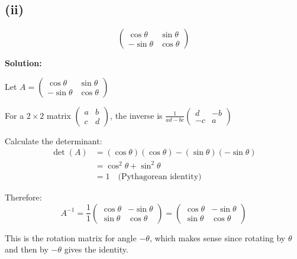 \subsection*{(ii)}
\[
\begin{pmatrix}
\cos\theta & \sin\theta\\
-\sin\theta & \cos\theta
\end{pmatrix}
\]

\textbf{Solution:}

Let $A = \begin{pmatrix}
\cos\theta & \sin\theta\\
-\sin\theta & \cos\theta
\end{pmatrix}$

For a $2 \times 2$ matrix $\begin{pmatrix} a & b \\ c & d \end{pmatrix}$, the inverse is $\frac{1}{ad-bc}\begin{pmatrix} d & -b \\ -c & a \end{pmatrix}$

Calculate the determinant:
\begin{align}
\det(A) &= (\cos\theta)(\cos\theta) - (\sin\theta)(-\sin\theta)\\
&= \cos^2\theta + \sin^2\theta\\
&= 1 \quad \text{(Pythagorean identity)}
\end{align}

Therefore:
\[
A^{-1} = \frac{1}{1}\begin{pmatrix}
\cos\theta & -\sin\theta\\
\sin\theta & \cos\theta
\end{pmatrix} = \begin{pmatrix}
\cos\theta & -\sin\theta\\
\sin\theta & \cos\theta
\end{pmatrix}
\]

This is the rotation matrix for angle $-\theta$, which makes sense since rotating by $\theta$ and then by $-\theta$ gives the identity.